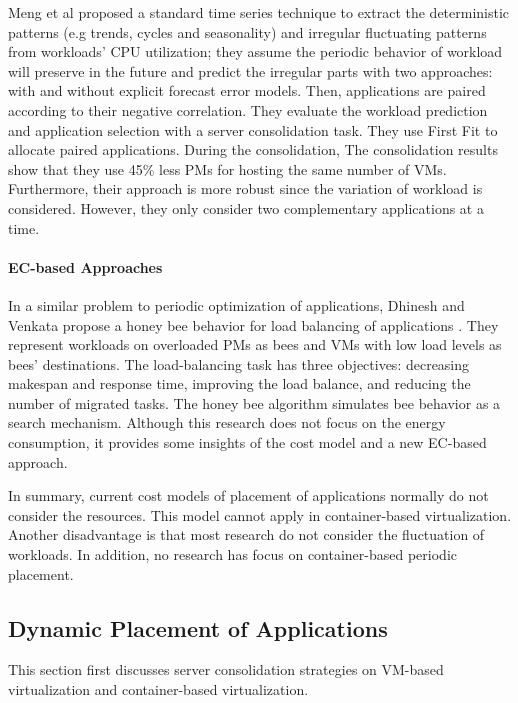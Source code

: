 Meng et al \cite{Meng:2010gh} proposed a standard time series technique to extract the deterministic patterns (e.g trends, cycles and seasonality) and irregular fluctuating patterns from workloads' CPU utilization; they assume the periodic behavior of workload will preserve in the future and predict the irregular parts with two approaches: with and without explicit forecast error models. Then, applications are paired according to their negative correlation. They evaluate the workload prediction and application selection with a server consolidation task. They use First Fit to allocate paired applications. During the consolidation, The consolidation results show that they use 45\% less PMs for hosting the same number of VMs. Furthermore, their approach is more robust since the variation of workload is considered. However, they only consider two complementary applications at a time. 

\paragraph{EC-based Approaches}
In a similar problem to periodic optimization of applications, Dhinesh and Venkata propose a honey bee behavior for load balancing  of applications \cite{Babu:2013jf}. They represent workloads on overloaded PMs as bees and VMs with low load levels as bees' destinations. The load-balancing task has three objectives: decreasing makespan and response time, improving the load balance, and reducing the number of migrated tasks. The honey bee algorithm simulates bee behavior as a search mechanism. Although this research does not focus on the energy consumption, it provides some insights of the cost model and a new EC-based approach.


\vspace{5mm}

In summary, current cost models of placement of applications normally do not consider the resources. This model cannot apply in container-based virtualization. Another disadvantage is that most research do not consider the fluctuation of workloads. In addition, no research has focus on container-based periodic placement. 



\subsection{Dynamic Placement of Applications}
This section first discusses server consolidation strategies on VM-based virtualization and container-based virtualization.

